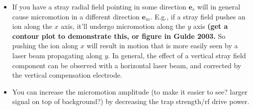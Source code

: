 \documentclass{article}
\begin{document}
\begin{itemize}
\item If you have a stray radial field pointing in some direction $\mathbf{e}_s$ will in general cause micromotion in a different direction $\mathbf{e}_m$. E.g., if a stray field pushes an ion along the $x$ axis, it'll undergo micromotion along the $y$ axis \textbf{(get a contour plot to demonstrate this, or figure in Gulde 2003.} So pushing the ion along $x$ will result in motion that is more easily seen by a laser beam propagating along $y$. In general, the effect of a vertical stray field component can be observed with a horizontal laser beam, and corrected by the vertical compensation electrode.

\item You can increase the micromotion amplitude (to make it easier to see? larger signal on top of background?) by decreasing the trap strength/rf drive power.
\end{itemize}
\end{document}
